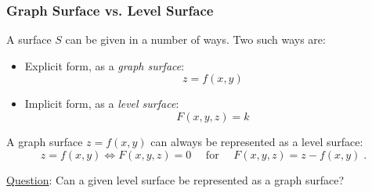 \begin{frame}
  \frametitle{Graph Surface vs. Level Surface}

A surface $S$ can be given in a number of ways. Two such ways are:

\begin{itemize}
  \item \pause Explicit form, as a \emph{graph surface}:
  $$z=f(x,y)$$
%
  \item \pause Implicit form, as a \emph{level surface}:
  $$F(x,y,z) = k$$
\end{itemize}

\pause
A graph surface $z=f(x,y)$ can always be represented as a level surface:
%
$$z=f(x,y) \Longleftrightarrow F(x,y,z) =0 \quad \text{ for } \quad F(x,y,z) = z-f(x,y)\; .$$

\pause
\underline{Question}: Can a given level surface be represented as a graph surface?
\end{frame}